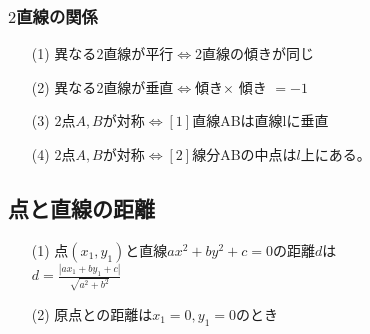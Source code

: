 \documentclass[twocolumn, 20pt]{jarticle}
\begin{document}
\subsubsection*{$2$直線の関係}
\begin{itemize}
  \item[(1)]異なる$2$直線が{\Large{平行$\Leftrightarrow$$2$直線の傾きが同じ}}
  \item[(2)]異なる$2$直線が{\Large{垂直$\Leftrightarrow$傾き$\times$ 傾き $=-1$}}
  \item[(3)]$2$点$A, B$が対称$\Leftrightarrow [1]直線$AB$は直線$l$に垂直$
  \item[(4)] $2$点$A, B$が対称$\Leftrightarrow[2]線分$AB$の中点はl$上にある。
\end{itemize}
\subsection*{点と直線の距離}
\begin{itemize}
  \item[(1)]点$(x_1, y_1)$と直線$ax^2 + by^2 + c=0$の距離$d$は\\ {\LARGE{$d = \frac{|ax_1 + by_1 + c|}{\sqrt{a^2 + b^2}}$}}
  \item[(2)]原点との距離は$x_1=0,y_1=0$のとき
\end{itemize}
\end{document}
